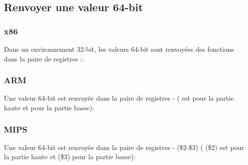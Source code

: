 ﻿\subsection{Renvoyer une valeur 64-bit}



\subsubsection{x86}

Dans un environnement 32-bit, les valeurs 64-bit sont renvoyées des fonctions dans
la paire de registres \EDX{}:\EAX{}.



\subsubsection{ARM}

Une valeur 64-bit est renvoyée dans la paire de registres - (
est pour la partie haute et  pour la partie basse):



\subsubsection{MIPS}

Une valeur 64-bit est renvoyée dans la paire de registres - (\$2-\$3)
( (\$2) est pour la partie haute et  (\$3) pour la partie basse):





